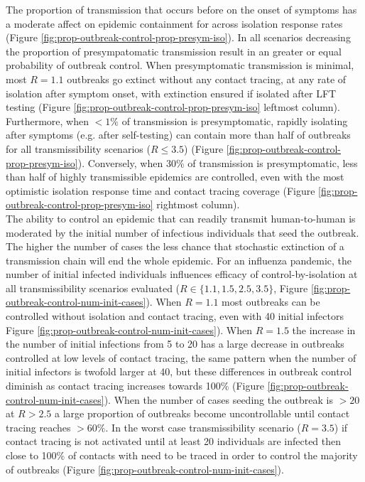 \documentclass{article}
\begin{document}
The proportion of transmission that occurs before on the onset of symptoms has a moderate affect on epidemic containment for across isolation response rates (Figure \ref{fig:prop-outbreak-control-prop-presym-iso}). In all scenarios decreasing the proportion of presympatomatic transmission result in an greater or equal probability of outbreak control. When presymptomatic transmission is minimal, most $R = 1.1$ outbreaks go extinct without any contact tracing, at any rate of isolation after symptom onset, with extinction ensured if isolated after LFT testing (Figure \ref{fig:prop-outbreak-control-prop-presym-iso} leftmost column). Furthermore, when  $<1\%$ of transmission is presymptomatic, rapidly isolating after symptoms (e.g. after self-testing) can contain more than half of outbreaks for all transmissibility scenarios ($R \leq 3.5$) (Figure \ref{fig:prop-outbreak-control-prop-presym-iso}). Conversely, when 30\% of transmission is presymptomatic, less than half of highly transmissible epidemics are controlled, even with the most optimistic isolation response time and contact tracing coverage (Figure \ref{fig:prop-outbreak-control-prop-presym-iso} rightmost column). \\

The ability to control an epidemic that can readily transmit human-to-human is moderated by the initial number of infectious individuals that seed the outbreak. The higher the number of cases the less chance that stochastic extinction of a transmission chain will end the whole epidemic. For an influenza pandemic, the number of initial infected individuals influences efficacy of control-by-isolation at all transmissibility scenarios evaluated ($R \in \{1.1, 1.5, 2.5, 3.5\}$, Figure \ref{fig:prop-outbreak-control-num-init-cases}). When $R = 1.1$ most outbreaks can be controlled without isolation and contact tracing, even with 40 initial infectors Figure \ref{fig:prop-outbreak-control-num-init-cases}). When $R = 1.5$ the increase in the number of initial infections from 5 to 20 has a large decrease in outbreaks controlled at low levels of contact tracing, the same pattern when the number of initial infectors is twofold larger at 40, but these differences in outbreak control diminish as contact tracing increases towards 100\% (Figure \ref{fig:prop-outbreak-control-num-init-cases}). When the number of cases seeding the outbreak is $>20$ at $R>2.5$ a large proportion of outbreaks become uncontrollable until contact tracing reaches $>60\%$. In the worst case transmissibility scenario ($R = 3.5$) if contact tracing is not activated until at least 20 individuals are infected then close to 100\% of contacts with need to be traced in order to control the majority of outbreaks (Figure \ref{fig:prop-outbreak-control-num-init-cases}).  \\
\end{document}
